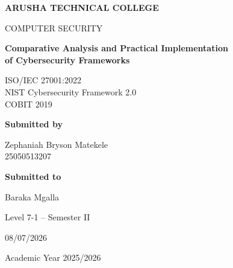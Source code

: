 \begin{titlepage}

\centering

\vspace*{\fill}

{\Large\bfseries ARUSHA TECHNICAL COLLEGE\par}

\vspace{1cm}

{\Large COMPUTER SECURITY\par}

\vspace{0.8cm}

{\Huge\bfseries
Comparative Analysis and Practical Implementation\\[0.3cm]
of Cybersecurity Frameworks
\par}

\vspace{0.8cm}

{\Large
ISO/IEC 27001:2022\\
NIST Cybersecurity Framework 2.0\\
COBIT 2019
\par}

\vspace{\fill}

\textbf{Submitted by}

\vspace{0.3cm}

Zephaniah Bryson Matekele\\
25050513207

\vspace{0.8cm}

\textbf{Submitted to}

\vspace{0.3cm}

Baraka Mgalla

\vspace{0.8cm}

Level 7-1 -- Semester II

\vspace{0.8cm}

08/07/2026

\vspace{0.8cm}

Academic Year 2025/2026

\vspace*{\fill}

\end{titlepage}